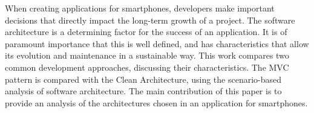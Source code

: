 When creating applications for smartphones, developers make important decisions that directly impact the long-term growth of a project.
The software architecture is a determining factor for the success of an application.
It is of paramount importance that this is well defined, and has characteristics that allow its evolution and maintenance in a sustainable way.
This work compares two common development approaches, discussing their characteristics.
The MVC pattern is compared with the Clean Architecture, using the scenario-based analysis of software architecture.
The main contribution of this paper is to provide an analysis of the architectures chosen in an application for smartphones.